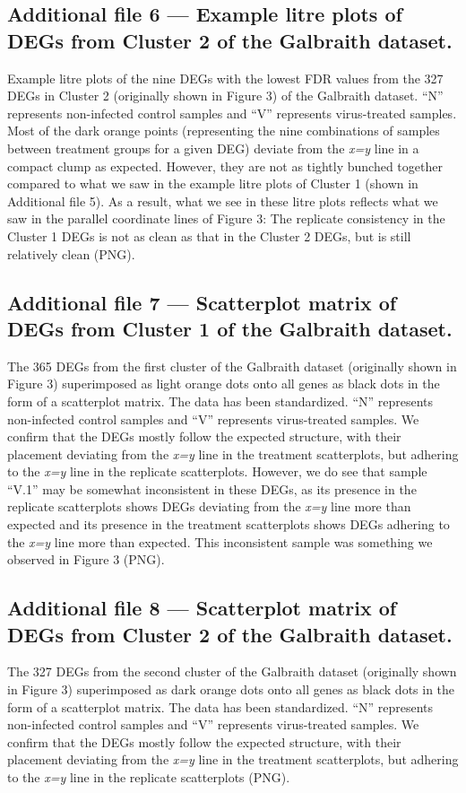 \documentclass{bmcart}
\begin{document}
\begin{linenumbers}
\begin{backmatter}
  \subsection*{Additional file 6 --- Example litre plots of DEGs from Cluster 2 of the Galbraith dataset.}
    Example litre plots of the nine DEGs with the lowest FDR values from the 327 DEGs in Cluster 2 (originally shown in Figure 3) of the Galbraith dataset. ``N'' represents non-infected control samples and ``V'' represents virus-treated samples. Most of the dark orange points (representing the nine combinations of samples between treatment groups for a given DEG) deviate from the \textit{x=y} line in a compact clump as expected. However, they are not as tightly bunched together compared to what we saw in the example litre plots of Cluster 1 (shown in Additional file 5). As a result, what we see in these litre plots reflects what we saw in the parallel coordinate lines of Figure 3: The replicate consistency in the Cluster 1 DEGs is not as clean as that in the Cluster 2 DEGs, but is still relatively clean (PNG).

  \subsection*{Additional file 7 --- Scatterplot matrix of DEGs from Cluster 1 of the Galbraith dataset.}
    The 365 DEGs from the first cluster of the Galbraith dataset (originally shown in Figure 3) superimposed as light orange dots onto all genes as black dots in the form of a scatterplot matrix. The data has been standardized. ``N'' represents non-infected control samples and ``V'' represents virus-treated samples. We confirm that the DEGs mostly follow the expected structure, with their placement deviating from the \textit{x=y} line in the treatment scatterplots, but adhering to the \textit{x=y} line in the replicate scatterplots. However, we do see that sample ``V.1'' may be somewhat inconsistent in these DEGs, as its presence in the replicate scatterplots shows DEGs deviating from the \textit{x=y} line more than expected and its presence in the treatment scatterplots shows DEGs adhering to the \textit{x=y} line more than expected. This inconsistent sample was something we observed in Figure 3 (PNG).
    
  \subsection*{Additional file 8 --- Scatterplot matrix of DEGs from Cluster 2 of the Galbraith dataset.}
    The 327 DEGs from the second cluster of the Galbraith dataset (originally shown in Figure 3) superimposed as dark orange dots onto all genes as black dots in the form of a scatterplot matrix. The data has been standardized. ``N'' represents non-infected control samples and ``V'' represents virus-treated samples. We confirm that the DEGs mostly follow the expected structure, with their placement deviating from the \textit{x=y} line in the treatment scatterplots, but adhering to the \textit{x=y} line in the replicate scatterplots (PNG).
    

\end{backmatter}
\end{linenumbers}
\end{document}

